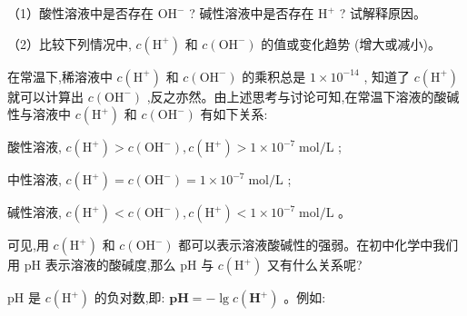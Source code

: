 \documentclass[10pt]{article}
\begin{document}
（1）酸性溶液中是否存在 \({\mathrm{{OH}}}^{ - }\) ? 碱性溶液中是否存在 \({\mathrm{H}}^{ + }\) ? 试解释原因。

（2）比较下列情况中, \(c\left( {\mathrm{H}}^{ + }\right)\) 和 \(c\left( {\mathrm{{OH}}}^{ - }\right)\) 的值或变化趋势 (增大或减小)。

\begin{center}
\end{center}

在常温下,稀溶液中 \(c\left( {\mathrm{H}}^{ + }\right)\) 和 \(c\left( {\mathrm{{OH}}}^{ - }\right)\) 的乘积总是 \(1 \times {10}^{-{14}}\) , 知道了 \(c\left( {\mathrm{H}}^{ + }\right)\) 就可以计算出 \(c\left( {\mathrm{{OH}}}^{ - }\right)\) ,反之亦然。由上述思考与讨论可知,在常温下溶液的酸碱性与溶液中 \(c\left( {\mathrm{H}}^{ + }\right)\) 和 \(c\left( {\mathrm{{OH}}}^{ - }\right)\) 有如下关系:

酸性溶液, \(c\left( {\mathrm{H}}^{ + }\right) > c\left( {\mathrm{{OH}}}^{ - }\right) ,c\left( {\mathrm{H}}^{ + }\right) > 1 \times {10}^{-7}\mathrm{\;{mol}}/\mathrm{L}\) ;

中性溶液, \(c\left( {\mathrm{H}}^{ + }\right) = c\left( {\mathrm{{OH}}}^{ - }\right) = 1 \times {10}^{-7}\mathrm{\;{mol}}/\mathrm{L}\) ;

碱性溶液, \(c\left( {\mathrm{H}}^{ + }\right) < c\left( {\mathrm{{OH}}}^{ - }\right) ,c\left( {\mathrm{H}}^{ + }\right) < 1 \times {10}^{-7}\mathrm{\;{mol}}/\mathrm{L}\) 。

可见,用 \(c\left( {\mathrm{H}}^{ + }\right)\) 和 \(c\left( {\mathrm{{OH}}}^{ - }\right)\) 都可以表示溶液酸碱性的强弱。在初中化学中我们用 \(\mathrm{{pH}}\) 表示溶液的酸碱度,那么 \(\mathrm{{pH}}\) 与 \(c\left( {\mathrm{H}}^{ + }\right)\) 又有什么关系呢?

\(\mathrm{{pH}}\) 是 \(c\left( {\mathrm{H}}^{ + }\right)\) 的负对数,即: \(\mathbf{{pH}} = - \lg c\left( {\mathbf{H}}^{ + }\right)\) 。例如:
\end{document}
